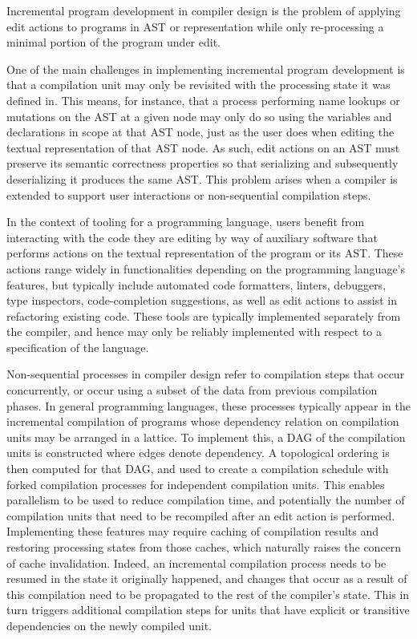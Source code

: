 Incremental program development in compiler design is the problem of applying edit actions to programs in \ac{AST} or representation while only re-processing a minimal portion of the program under edit.

One of the main challenges in implementing incremental program development is that a compilation unit may only be revisited with the processing state it was defined in.
This means, for instance, that a process performing name lookups or mutations on the \ac{AST} at a given node may only do so using the variables and declarations in scope at that \ac{AST} node, just as the user does when editing the textual representation of that \ac{AST} node.
As such, edit actions on an \ac{AST} must preserve its semantic correctness properties so that serializing and subsequently deserializing it produces the same \ac{AST}.
This problem arises when a compiler is extended to support user interactions or non-sequential compilation steps.

In the context of tooling for a programming language, users benefit from interacting with the code they are editing by way of auxiliary software that performs actions on the textual representation of the program or its \ac{AST}.
These actions range widely in functionalities depending on the programming language's features, but typically include automated code formatters, linters, debuggers, type inspectors, code-completion suggestions, as well as edit actions to assist in refactoring existing code.
These tools are typically implemented separately from the compiler, and hence may only be reliably implemented with respect to a specification of the language.


Non-sequential processes in compiler design refer to compilation steps that occur concurrently, or occur using a subset of the data from previous compilation phases.
In general programming languages, these processes typically appear in the incremental compilation of programs whose dependency relation on compilation units may be arranged in a lattice.
To implement this, a \ac{DAG} of the compilation units is constructed where edges denote dependency.
A topological ordering is then computed for that \ac{DAG}, and used to create a compilation schedule with forked compilation processes for independent compilation units.
This enables parallelism to be used to reduce compilation time, and potentially the number of compilation units that need to be recompiled after an edit action is performed.
Implementing these features may require caching of compilation results and restoring processing states from those caches, which naturally raises the concern of cache invalidation.
Indeed, an incremental compilation process needs to be resumed in the state it originally happened, and changes that occur as a result of this compilation need to be propagated to the rest of the compiler's state.
This in turn triggers additional compilation steps for units that have explicit or transitive dependencies on the newly compiled unit.

